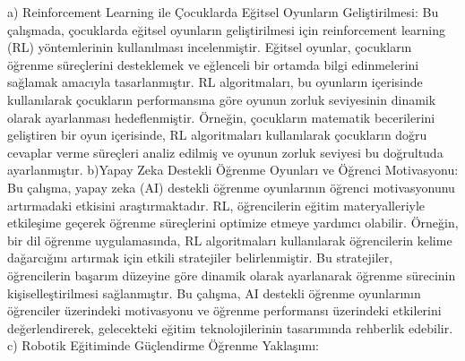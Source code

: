 \documentclass[12pt, a4paper]{article}
\begin{document}
a) Reinforcement Learning ile Çocuklarda Eğitsel Oyunların Geliştirilmesi:	Bu çalışmada, çocuklarda eğitsel oyunların geliştirilmesi için reinforcement learning (RL) yöntemlerinin kullanılması incelenmiştir. Eğitsel oyunlar, çocukların öğrenme süreçlerini desteklemek ve eğlenceli bir ortamda bilgi edinmelerini sağlamak amacıyla tasarlanmıştır. RL algoritmaları, bu oyunların içerisinde kullanılarak çocukların performansına göre oyunun zorluk seviyesinin dinamik olarak ayarlanması hedeflenmiştir. Örneğin, çocukların matematik becerilerini geliştiren bir oyun içerisinde, RL algoritmaları kullanılarak çocukların doğru cevaplar verme süreçleri analiz edilmiş ve oyunun zorluk seviyesi bu doğrultuda ayarlanmıştır.
b)Yapay Zeka Destekli Öğrenme Oyunları ve Öğrenci Motivasyonu:
Bu çalışma, yapay zeka (AI) destekli öğrenme oyunlarının öğrenci motivasyonunu artırmadaki etkisini araştırmaktadır. RL, öğrencilerin eğitim materyalleriyle etkileşime geçerek öğrenme süreçlerini optimize etmeye yardımcı olabilir. Örneğin, bir dil öğrenme uygulamasında, RL algoritmaları kullanılarak öğrencilerin kelime dağarcığını artırmak için etkili stratejiler belirlenmiştir. Bu stratejiler, öğrencilerin başarım düzeyine göre dinamik olarak ayarlanarak öğrenme sürecinin kişiselleştirilmesi sağlanmıştır. Bu çalışma, AI destekli öğrenme oyunlarının öğrenciler üzerindeki motivasyonu ve öğrenme performansı üzerindeki etkilerini değerlendirerek, gelecekteki eğitim teknolojilerinin tasarımında rehberlik edebilir.
c) Robotik Eğitiminde Güçlendirme Öğrenme Yaklaşımı:
\end{document}
